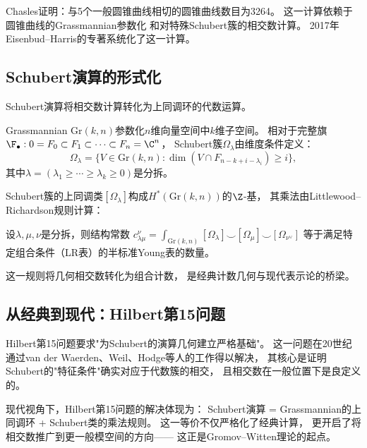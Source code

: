 \begin{example}[3264条相切圆锥曲线]\label{ex:3264}
Chasles证明：与5个一般圆锥曲线相切的圆锥曲线数目为3264。
这一计算依赖于圆锥曲线的Grassmannian参数化
和对特殊Schubert簇的相交数计算。
2017年Eisenbud--Harris的专著\cite{EH2016}系统化了这一计算。
\end{example}

\subsection{Schubert演算的形式化}

Schubert演算将相交数计算转化为上同调环的代数运算。

\begin{definition}[Grassmannian与Schubert簇]\label{def:grassmannian}
Grassmannian $\mathrm{Gr}(k, n)$参数化$n$维向量空间中$k$维子空间。
相对于完整旗$\F_\bullet: 0 = F_0 \subset F_1 \subset \cdots \subset F_n = \C^n$，
Schubert簇$\Omega_\lambda$由维度条件定义：
\[
\Omega_\lambda = \{V \in \mathrm{Gr}(k,n) : \dim(V \cap F_{n-k+i-\lambda_i}) \geq i\},
\]
其中$\lambda = (\lambda_1 \geq \cdots \geq \lambda_k \geq 0)$是分拆。
\end{definition}

Schubert簇的上同调类$[\Omega_\lambda]$构成$H^*(\mathrm{Gr}(k,n))$的$\Z$-基，
其乘法由Littlewood--Richardson规则计算：

\begin{theorem}\label{thm:LR}
设$\lambda, \mu, \nu$是分拆，则结构常数
$c_{\lambda\mu}^{\nu} = \int_{\mathrm{Gr}(k,n)} [\Omega_\lambda] \smile [\Omega_\mu] \smile [\Omega_{\nu^\vee}]$
等于满足特定组合条件（LR表）的半标准Young表的数量。
\end{theorem}

这一规则将几何相交数转化为组合计数，
是经典计数几何与现代表示论的桥梁。

\subsection{从经典到现代：Hilbert第15问题}

Hilbert第15问题要求"为Schubert的演算几何建立严格基础"。
这一问题在20世纪通过van der Waerden、Weil、Hodge等人的工作得以解决，
其核心是证明Schubert的"特征条件"确实对应于代数簇的相交，
且相交数在一般位置下是良定义的。

现代视角下，Hilbert第15问题的解决体现为：
Schubert演算 = Grassmannian的上同调环 + Schubert类的乘法规则。
这一等价不仅严格化了经典计算，
更开启了将相交数推广到更一般模空间的方向——
这正是Gromov--Witten理论的起点。
